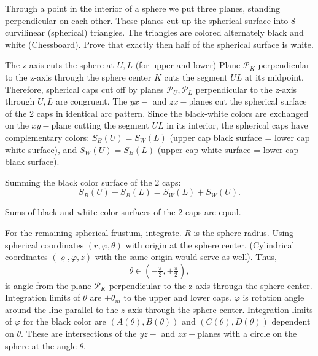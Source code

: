 \begin{question}[name={Hanging Sector by Atan}]
	Through a point in the interior of a sphere we put three planes, standing perpendicular on each other. These planes cut up the spherical surface into 8 curvilinear (spherical) triangles. The triangles are colored alternately black and white (Chessboard). Prove that exactly then half of the spherical surface is white.
\end{question}





\begin{solution}[name={Solution by Yetti}] 
	The z-axis cuts the sphere at $ U, L$ (for upper and lower) Plane $ \mathcal P_K$ perpendicular to the z-axis through the sphere center $ K$ cuts the segment $ UL$ at its midpoint. Therefore, spherical caps cut off by planes $ \mathcal P_U, \mathcal P_L$ perpendicular to the z-axis through $ U, L$ are congruent. The $yx-$ and $zx-$planes cut the spherical surface of the 2 caps in identical arc pattern. Since the black-white colors are exchanged on the $xy-$plane cutting the segment $ UL$ in its interior, the spherical caps have complementary colors: $ S_B(U) = S_W(L)$ (upper cap black surface = lower cap white surface), and $ S_W(U) = S_B(L)$ (upper cap white surface = lower cap black surface).
	
	Summing the black color surface of the 2 caps: \[S_B(U) + S_B(L) = S_W(L) + S_W(U).\]
	
	Sums of black and white color surfaces of the 2 caps are equal.
	
	For the remaining spherical frustum, integrate. $ R$ is the sphere radius. Using spherical coordinates $ (r, \varphi, \theta)$ with origin at the sphere center. (Cylindrical coordinates $ (\varrho, \varphi, z)$ with the same origin would serve as well). Thus, $$ \theta \in ( - \frac {_{\pi}}{^2}, + \frac {_{\pi}}{^2}),$$ is angle from the plane $ \mathcal P_K$ perpendicular to the z-axis through the sphere center. Integration limits of $ \theta$ are $ \pm \theta_m$ to the upper and lower caps. $ \varphi$ is rotation angle around the line parallel to the $z$-axis through the sphere center. Integration limits of $ \varphi$ for the black color are $ (A(\theta), B(\theta))$ and $ (C(\theta), D(\theta))$ dependent on $ \theta.$ These are intersections of the $yz-$ and $zx-$planes with a circle on the sphere at the angle $ \theta.$
	

\end{solution}
